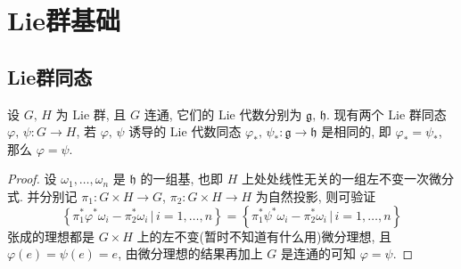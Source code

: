\chapter{Lie群基础}
\section{Lie群同态}
    \begin{theorem}
        设 $G,\,H$ 为 $\mathrm{Lie}$ 群, 且 $G$ 连通, 
        它们的 $\mathrm{Lie}$ 代数分别为 $\mathfrak{g,\,h}$. 
        现有两个 $\mathrm{Lie}$ 群同态 $\varphi,\,\psi:G\rightarrow H$, 
        若 $\varphi,\,\psi$ 诱导的 $\mathrm{Lie}$ 代数同态 
        $\varphi_*,\,\psi_*:\mathfrak{g}\rightarrow\mathfrak{h}$ 是相同的, 
        即 $\varphi_*=\psi_*$, 那么 $\varphi=\psi$.
    \end{theorem}
    \begin{proof}
        设 $\omega_1,\dots,\omega_n$ 是 $\mathfrak{h}$ 的一组基, 
        也即 $H$ 上处处线性无关的一组左不变一次微分式.
        并分别记 $\pi_1:G\times H\rightarrow G$, $\pi_2:G\times H\rightarrow H$ 
        为自然投影, 则可验证
        \begin{equation*}
            \left\{\pi_1^*\varphi^*\omega_i-\pi_2^*\omega_i\,\Big|\,i=1,\dots,n\right\} = \left\{\pi_1^*\psi^*\omega_i-\pi_2^*\omega_i\,\Big|\,i=1,\dots,n\right\}
        \end{equation*}
        张成的理想都是 $G\times H$ 上的左不变(暂时不知道有什么用)微分理想, 
        且 $\varphi(e) = \psi(e) = e$, 
        由微分理想的结果再加上 $G$ 是连通的可知 $\varphi = \psi$.
    \end{proof}
